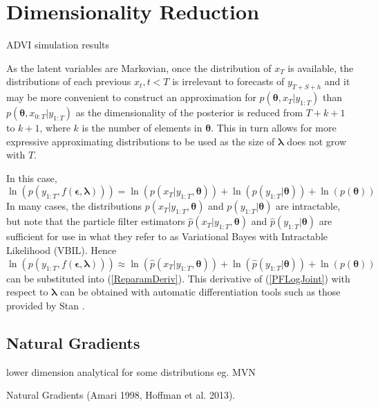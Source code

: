 \documentclass[12pt,a4paper]{article}%
\numberwithin{equation}{section}
\begin{document}
\section{Dimensionality Reduction}

ADVI simulation results

As the latent variables are Markovian, once the distribution of $x_T$ is available, the distributions of each previous $x_t, t < T$ is irrelevant to forecasts of $y_{T+S+h}$ and it may be more convenient to construct an approximation for $p(\boldsymbol{\theta}, x_T | y_{1:T})$ than $p(\boldsymbol{\theta}, x_{0:T} | y_{1:T})$ as the dimensionality of the posterior is reduced from $T+k+1$ to $k+1$, where $k$ is the number of elements in $\boldsymbol{\theta}$. This in turn allows for more expressive approximating distributions to be used as the size of $\boldsymbol{\lambda}$ does not grow with $T$.

In this case,
\begin{equation}
\label{DimRedLogJoint}
\ln(p(y_{1:T}, f(\boldsymbol{\epsilon}, \boldsymbol{\lambda}))) = \ln(p(x_T | y_{1:T}, \boldsymbol{\theta})) + \ln(p(y_{1:T} |\boldsymbol{\theta})) + \ln(p(\boldsymbol{\theta}))
\end{equation}
In many cases, the distributions $p(x_T | y_{1:T}, \boldsymbol{\theta})$ and $p(y_{1:T} | \boldsymbol{\theta})$ are intractable, but \citet{TNK2017} note that the particle filter estimators $\hat{p}(x_T | y_{1:T}, \boldsymbol{\theta})$ and $\hat{p}(y_{1:T} | \boldsymbol{\theta})$ are sufficient for use in what they refer to as Variational Bayes with Intractable Likelihood (VBIL). Hence
\begin{equation}
\label{PFLogJoint}
\ln(p(y_{1:T}, f(\boldsymbol{\epsilon}, \boldsymbol{\lambda}))) \approx \ln(\hat{p}(x_T | y_{1:T}, \boldsymbol{\theta})) + \ln(\hat{p}(y_{1:T} |\boldsymbol{\theta})) + \ln(p(\boldsymbol{\theta}))
\end{equation}
can be substituted into (\ref{ReparamDeriv}). This derivative of (\ref{PFLogJoint}) with respect to $\boldsymbol{\lambda}$ can be obtained with automatic differentiation tools such as those provided by Stan \citep{Carpenter2015}.

\subsection{Natural Gradients}

lower dimension 
analytical for some distributions eg. MVN

Natural Gradients  (Amari 1998, Hoffman et al. 2013).
\end{document}

